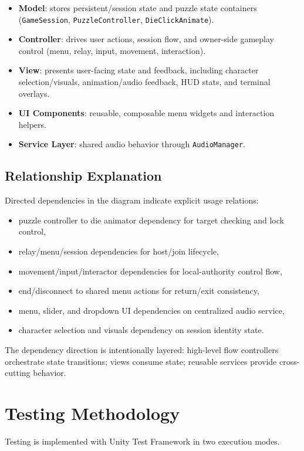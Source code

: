 \begin{itemize}
\item \textbf{Model}: stores persistent/session state and puzzle state containers (\texttt{GameSession}, \texttt{PuzzleController}, \texttt{DieClickAnimate}).
\item \textbf{Controller}: drives user actions, session flow, and owner-side gameplay control (menu, relay, input, movement, interaction).
\item \textbf{View}: presents user-facing state and feedback, including character selection/visuals, animation/audio feedback, HUD stats, and terminal overlays.
\item \textbf{UI Components}: reusable, composable menu widgets and interaction helpers.
\item \textbf{Service Layer}: shared audio behavior through \texttt{AudioManager}.
\end{itemize}

\subsection*{Relationship Explanation}
Directed dependencies in the diagram indicate explicit usage relations:
\begin{itemize}
\item puzzle controller to die animator dependency for target checking and lock control,
\item relay/menu/session dependencies for host/join lifecycle,
\item movement/input/interactor dependencies for local-authority control flow,
\item end/disconnect to shared menu actions for return/exit consistency,
\item menu, slider, and dropdown UI dependencies on centralized audio service,
\item character selection and visuals dependency on session identity state.
\end{itemize}

The dependency direction is intentionally layered: high-level flow controllers orchestrate state transitions; views consume state; reusable services provide cross-cutting behavior.

\newpage

\section{Testing Methodology}
Testing is implemented with Unity Test Framework \cite{unity_test_framework_docs} in two execution modes.

